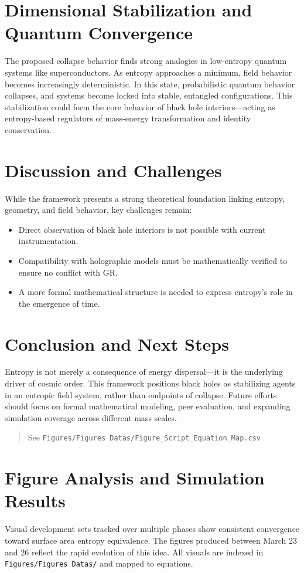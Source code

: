 \documentclass[12pt]{article}
\begin{document}
\section{Dimensional Stabilization and Quantum Convergence}
The proposed collapse behavior finds strong analogies in low-entropy quantum systems like superconductors. As entropy approaches a minimum, field behavior becomes increasingly deterministic. In this state, probabilistic quantum behavior collapses, and systems become locked into stable, entangled configurations. This stabilization could form the core behavior of black hole interiors—acting as entropy-based regulators of mass-energy transformation and identity conservation.

\section{Discussion and Challenges}
While the framework presents a strong theoretical foundation linking entropy, geometry, and field behavior, key challenges remain:
\begin{itemize}
    \item Direct observation of black hole interiors is not possible with current instrumentation.
    \item Compatibility with holographic models must be mathematically verified to ensure no conflict with GR.
    \item A more formal mathematical structure is needed to express entropy's role in the emergence of time.
\end{itemize}

\section{Conclusion and Next Steps}
Entropy is not merely a consequence of energy dispersal—it is the underlying driver of cosmic order. This framework positions black holes as stabilizing agents in an entropic field system, rather than endpoints of collapse. Future efforts should focus on formal mathematical modeling, peer evaluation, and expanding simulation coverage across different mass scales.


\begin{quote}
See \texttt{Figures/Figures~Datas/Figure\_Script\_Equation\_Map.csv}
\end{quote}

\section{Figure Analysis and Simulation Results}
Visual development sets tracked over multiple phases show consistent convergence toward surface area entropy equivalence. The figures produced between March 23 and 26 reflect the rapid evolution of this idea. All visuals are indexed in \texttt{Figures/Figures Datas/} and mapped to equations.
\end{document}
